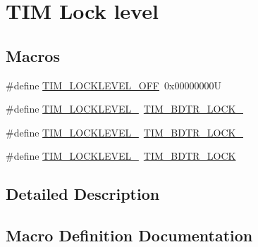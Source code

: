 \hypertarget{group___t_i_m___lock__level}{}\section{T\+IM Lock level}
\label{group___t_i_m___lock__level}
\subsection*{Macros}
\begin{DoxyCompactItemize}
\item 
\#define \hyperlink{group___t_i_m___lock__level_ga304aece56a9391a4d9b1016144d98fbd}{T\+I\+M\+\_\+\+L\+O\+C\+K\+L\+E\+V\+E\+L\+\_\+\+O\+FF}~0x00000000U
\item 
\#define \hyperlink{group___t_i_m___lock__level_ga46dc7705788ba2ce5135c43b998ef4dd}{T\+I\+M\+\_\+\+L\+O\+C\+K\+L\+E\+V\+E\+L\+\_}~\hyperlink{group___peripheral___registers___bits___definition_gabbd1736c8172e7cd098bb591264b07bf}{T\+I\+M\+\_\+\+B\+D\+T\+R\+\_\+\+L\+O\+C\+K\+\_}
\item 
\#define \hyperlink{group___t_i_m___lock__level_ga03a5ed2aded43ccfe7ab12a9dd53d251}{T\+I\+M\+\_\+\+L\+O\+C\+K\+L\+E\+V\+E\+L\+\_}~\hyperlink{group___peripheral___registers___bits___definition_ga756df80ff8c34399435f52dca18e6eee}{T\+I\+M\+\_\+\+B\+D\+T\+R\+\_\+\+L\+O\+C\+K\+\_}
\item 
\#define \hyperlink{group___t_i_m___lock__level_gaa1afed375c27151608e388fdf4a57a13}{T\+I\+M\+\_\+\+L\+O\+C\+K\+L\+E\+V\+E\+L\+\_}~\hyperlink{group___peripheral___registers___bits___definition_ga7e4215d17f0548dfcf0b15fe4d0f4651}{T\+I\+M\+\_\+\+B\+D\+T\+R\+\_\+\+L\+O\+CK}
\end{DoxyCompactItemize}


\subsection{Detailed Description}


\subsection{Macro Definition Documentation}
\mbox{\label{group___t_i_m___lock__level_ga46dc7705788ba2ce5135c43b998ef4dd}} 
